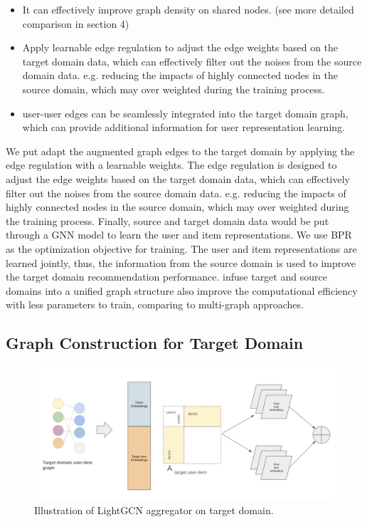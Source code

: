 \begin{itemize}
    \item It can effectively improve graph density on shared nodes. (see more detailed comparison in section 4)
    \item Apply learnable edge regulation to adjust the edge weights based on the target domain data, which can effectively filter out the noises from the source domain data. e.g. reducing the impacts of highly connected nodes in the source domain, which may over weighted during the training process.
    \item user-user edges can be seamlessly integrated into the target domain graph, which can provide additional information for user representation learning.
\end{itemize}

We put adapt the augmented graph edges to the target domain by applying the edge regulation with a learnable weights.
The edge regulation is designed to adjust the edge weights based on the target domain data, which can effectively filter out the noises from the source domain data. e.g. reducing the impacts of highly connected nodes in the source domain, which may over weighted during the training process.
Finally, source and target domain data would be put through a GNN model to learn the user and item representations.
We use BPR as the optimization objective for training.
The user and item representations are learned jointly, thus, the information from the source domain is used to improve the target domain recommendation performance.
infuse target and source domains into a unified graph structure also improve the computational efficiency with less parameters to train, comparing to multi-graph approaches.

\subsection{Graph Construction for Target Domain}


\begin{figure}
    \centering
    \includegraphics[width=1\textwidth]{figs/target-domain-graph.png}
    \caption{Illustration of LightGCN aggregator on target domain.}
    \label{fig:lightgcn}
\end{figure}


